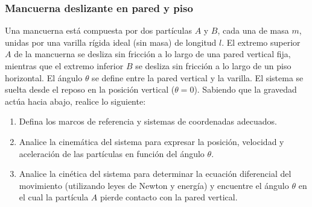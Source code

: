 \subsubsection{Mancuerna deslizante en pared y piso}

Una mancuerna está compuesta por dos partículas $A$ y $B$, cada una de masa $m$, unidas por una varilla rígida ideal (sin masa) de longitud $l$. El extremo superior $A$ de la mancuerna se desliza sin fricción a lo largo de una pared vertical fija, mientras que el extremo inferior $B$ se desliza sin fricción a lo largo de un piso horizontal. El ángulo $\theta$ se define entre la pared vertical y la varilla. El sistema se suelta desde el reposo en la posición vertical ($\theta=0$). Sabiendo que la gravedad actúa hacia abajo, realice lo siguiente:

\begin{enumerate}
    \item Defina los marcos de referencia y sistemas de coordenadas adecuados.
    \item Analice la cinemática del sistema para expresar la posición, velocidad y aceleración de las partículas en función del ángulo $\theta$.
    \item Analice la cinética del sistema para determinar la ecuación diferencial del movimiento (utilizando leyes de Newton y energía) y encuentre el ángulo $\theta$ en el cual la partícula $A$ pierde contacto con la pared vertical.
\end{enumerate}

